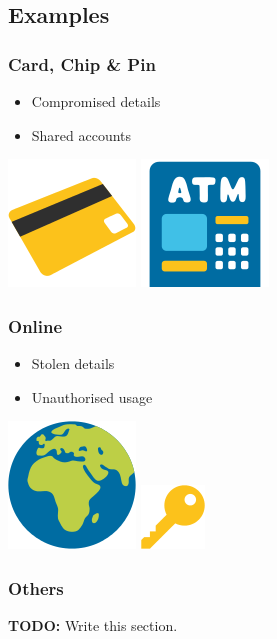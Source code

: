 \documentclass{beamer}
\begin{document}
    \subsection{Examples}
      \begin{frame}
        \frametitle{Card, Chip \& Pin}
        \begin{itemize}
          \item Compromised details
          \item Shared accounts
        \end{itemize}
        \vfill
        \includegraphics[scale=0.25]{card}\cite{WikiCommonsEmoji}
        \hfill
        \includegraphics[scale=0.25]{atm}\cite{WikiCommonsEmoji}
      \end{frame}
      \begin{frame}
        \frametitle{Online}
        \begin{itemize}
          \item Stolen details
          \item Unauthorised usage
        \end{itemize}
        \vfill
        \includegraphics[scale=0.25]{web}\cite{WikiCommonsEmoji}
        \hfill
        \includegraphics[scale=0.5]{password}\cite{WikiCommonsEmoji}
      \end{frame}
      \begin{frame}
        \frametitle{Others}
        \textbf{TODO:} Write this section.
      \end{frame}
\end{document}
